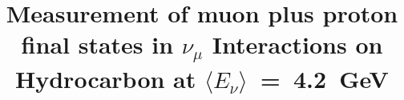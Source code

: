 \documentclass[aps,prl,preprint,showpacs,superscriptaddress,nofootinbib,linenumbers]{revtex4}
\newcommand{\numu}{\ensuremath{\nu_{\mu}}\xspace}
\newcommand{\enu}{\ensuremath{E_{\nu}}\xspace}
\begin{document}
\ifnum{}
\linenumbers
\fi

\title{Measurement of muon plus proton final states in \numu Interactions on Hydrocarbon at $\langle\enu\rangle$~=~4.2~GeV}



\newcommand{\deceased}{Deceased}

\newcommand{\wroclaw}{Institute of Theoretical Physics, Wroc\l aw University, Wroc\l aw, Poland}    

\end{document}
